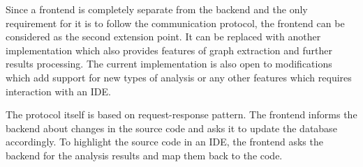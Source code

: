 Since a frontend is completely separate from the backend and the only requirement for it is to follow the communication protocol, the frontend can be considered as the second extension point.
It can be replaced with another implementation which also provides features of graph extraction and further results processing. 
The current implementation is also open to modifications which add support for new types of analysis or any other features which requires interaction with an IDE.

The protocol itself is based on request-response pattern.
The frontend informs the backend about changes in the source code and asks it to update the database accordingly.
To highlight the source code in an IDE, the frontend asks the backend for the analysis results and map them back to the code. 
